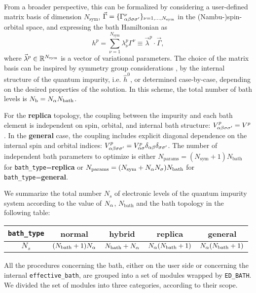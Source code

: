 \documentclass[edipack_sp.tex]{subfiles}
\begin{document}
From a broader perspective, this can be formalized by considering  
a user-defined matrix basis of dimension $N_\mathrm{sym}$, 
$\vec{\Gamma}=\{ \Gamma^\nu_{\alpha\beta\sigma\sigma'} \}_{\nu=1,\dots,N_\mathrm{sym}}$ in the (Nambu-)spin-orbital
space, and expressing the bath Hamiltonian as
$$
h^p = \sum_{\nu=1}^{N_\mathrm{sym}} \lambda^p_\nu
\Gamma^\nu\equiv \vec{\lambda}^p\cdot \vec{\Gamma},
\label{eq:replica_bath_sym}
$$
where $\vec{\lambda}^p\in\mathbb{R}^{N_\mathrm{sym}}$ is a vector of variational parameters. 
The choice of the matrix basis can be inspired by symmetry group considerations \cite{Koch2008PRB,Senechal2010PRB}, by the internal structure
of the quantum impurity, i.e. $\hat{h}^0$, or determined
case-by-case, depending on the desired properties of the solution.
In this scheme, the total number of bath levels is  $N_\mathrm{b}
= N_\alpha N_\mathrm{bath}$. 


For the {\bf replica} topology, the coupling between the impurity 
and each bath element is independent on spin, orbital, and internal 
bath structure: $V^p_{\alpha\beta\sigma\sigma'} = V^p$.
In the {\bf general} case, the coupling includes explicit 
diagonal
dependence on the internal spin and orbital indices: $V^p_{\alpha\beta\sigma\sigma'}
= V^p_{\alpha\sigma}\delta_{\alpha\beta}\delta_{\sigma\sigma'}$. 
%
The number of independent bath parameters to optimize is either 
$N_\mathrm{params} = (N_\mathrm{sym}+1)N_\mathrm{bath}$ for {\tt bath\_type}={\bf replica} or 
$N_\mathrm{params} = (N_\mathrm{sym}+N_\alpha N_\sigma)N_\mathrm{bath}$ for {\tt bath\_type}={\bf general}.

We summarize the total number $N_s$ of electronic levels of the quantum impurity system according to the value of $N_\alpha$, $N_\mathrm{bath}$ and the bath topology in the following table:
\begin{center}
\begin{tabular}{ |c||c|c|c|c| } 
 \hline     
{\tt bath\_type} & {\bf normal} & {\bf hybrid} & {\bf replica} & {\bf general}\\
 \hline 
  \hline    
  $N_s$ & 
 $(N_\mathrm{bath}+1)N_\alpha$ & 
 $N_\mathrm{bath}+N_\alpha$ & 
 $N_\alpha(N_\mathrm{bath}+1)$ & 
 $N_\alpha(N_\mathrm{bath}+1)$  \\ 
 \hline
\end{tabular}
\end{center}

\vspace{2mm}
All the procedures concerning the bath, either on the user side or concerning the internal {\tt effective\_bath}, are grouped into a set of modules wrapped by {\tt ED\_BATH}. We divided the set of modules into three categories, according to their scope.
\end{document}
